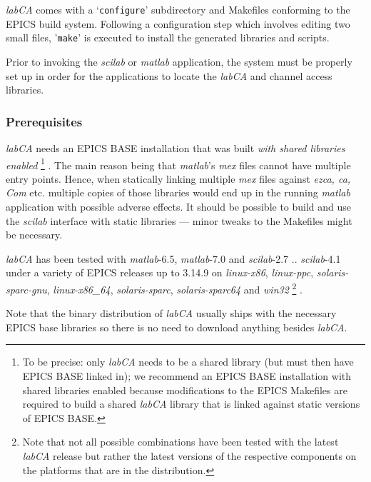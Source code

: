 \documentclass{article}
\newcommand{\sca}{\ita{labCA}}
\newcommand{\scilab}{\ita{scilab}}
\newcommand{\matlab}{\ita{matlab}}
\newcommand{\windoze}{\ita{win32}}
\newcommand{\com}[1]{{\tt #1}}
\newcommand{\pbrkf}{\pagebreak}
\newcommand{\ita}[1]{\emph{#1}}
\renewcommand{\pbrkf}{}
\begin{document}
\sca{} comes with a `\com{configure}' subdirectory and Makefiles conforming to the
EPICS build system. Following a configuration step which involves editing
two small files, '\com{make}' is executed to install the generated libraries
and scripts.

Prior to invoking the \scilab{} or \matlab{} application, the system
must be properly set up in order for the applications to locate the
\sca{} and channel access libraries.

\subsubsection{Prerequisites}
\sca{} needs an EPICS BASE installation that was built \ita{with shared
libraries enabled}%
\footnote{
To be precise: only \sca{} needs to be a shared library (but must then have
EPICS BASE linked in); we recommend an EPICS BASE installation with
shared libraries enabled because modifications to the EPICS Makefiles
are required to build a shared \sca{} library that is linked against
static versions of EPICS BASE.}%
.
The main reason being that \matlab's \ita{mex} files cannot
have multiple entry points. Hence, when statically linking multiple \ita{mex}
files against \ita{ezca, ca, Com} etc. multiple copies of those libraries
would end up in the running \matlab{} application with possible adverse
effects. It should be possible to build and use the \scilab{} interface
with static libraries --- minor tweaks to the Makefiles might be necessary.

\sca{} has been tested with \matlab-6.5, \matlab-7.0 and \scilab-2.7 .. \scilab-4.1
under a variety of EPICS releases up to 3.14.9 on \ita{linux-x86},
\ita{linux-ppc}, \ita{solaris-sparc-gnu},
\ita{linux-x86\_64}, \ita{solaris-sparc}, \ita{solaris-sparc64}
and \windoze%
\footnote{
Note that not all possible combinations have been tested with the latest \sca{} release
but rather the latest versions of the respective components on the platforms
that are in the distribution.}%
.

Note that the binary distribution of \sca{} usually ships with the
necessary EPICS base libraries so there is no need to download anything
besides \sca.

\pbrkf
\end{document}

